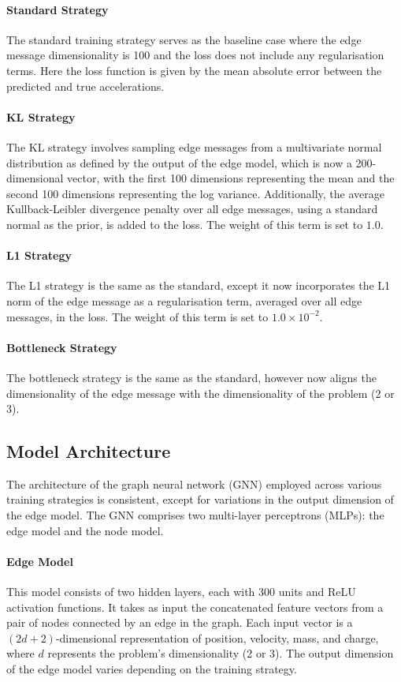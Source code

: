 \documentclass[11pt]{article}
\begin{document}
\paragraph*{Standard Strategy}
The standard training strategy serves as the baseline case where the edge message dimensionality is 100 and the loss does not include any regularisation terms. Here the loss function is given by the mean absolute error between the predicted and true accelerations.

\paragraph*{KL Strategy}
The KL strategy involves sampling edge messages from a multivariate normal distribution as defined by the output of the edge model, which is now a 200-dimensional vector, with the first 100 dimensions representing the mean and the second 100 dimensions representing the log variance. Additionally, the average Kullback-Leibler divergence penalty over all edge messages, using a standard normal as the prior, is added to the loss. The weight of this term is set to \(1.0 \).

\paragraph*{L1 Strategy}
The L1 strategy is the same as the standard, except it now incorporates the L1 norm of the edge message as a regularisation term, averaged over all edge messages, in the loss. The weight of this term is set to \(1.0 \times 10^{-2}\).

\paragraph*{Bottleneck Strategy}
The bottleneck strategy is the same as the standard, however now aligns the dimensionality of the edge message with the dimensionality of the problem (2 or 3).

\subsection{Model Architecture}
The architecture of the graph neural network (GNN) employed across various training strategies is consistent, except for variations in the output dimension of the edge model. The GNN comprises two multi-layer perceptrons (MLPs): the edge model and the node model.

\paragraph*{Edge Model} This model consists of two hidden layers, each with 300 units and ReLU activation functions. It takes as input the concatenated feature vectors from a pair of nodes connected by an edge in the graph. Each input vector is a $(2d+2)$-dimensional representation of position, velocity, mass, and charge, where $d$ represents the problem's dimensionality (2 or 3). The output dimension of the edge model varies depending on the training strategy.
\end{document}
